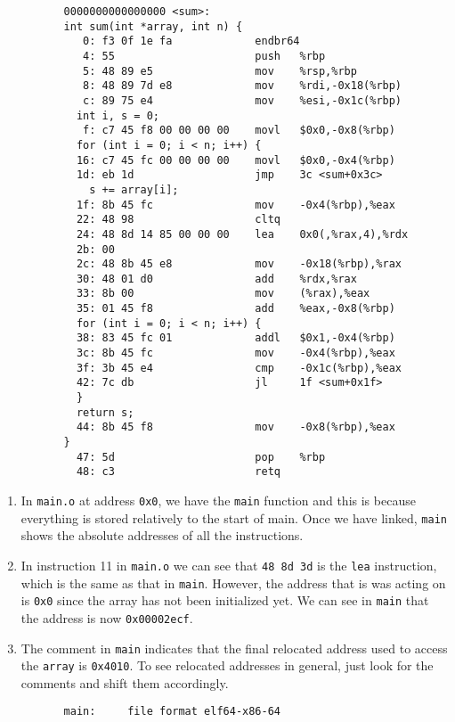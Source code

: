 \begin{example}
\begin{lstlisting}
          0000000000000000 <sum>:
          int sum(int *array, int n) {
             0:	f3 0f 1e fa          	endbr64 
             4:	55                   	push   %rbp
             5:	48 89 e5             	mov    %rsp,%rbp
             8:	48 89 7d e8          	mov    %rdi,-0x18(%rbp)
             c:	89 75 e4             	mov    %esi,-0x1c(%rbp)
            int i, s = 0; 
             f:	c7 45 f8 00 00 00 00 	movl   $0x0,-0x8(%rbp)
            for (int i = 0; i < n; i++) {
            16:	c7 45 fc 00 00 00 00 	movl   $0x0,-0x4(%rbp)
            1d:	eb 1d                	jmp    3c <sum+0x3c>
              s += array[i]; 
            1f:	8b 45 fc             	mov    -0x4(%rbp),%eax
            22:	48 98                	cltq   
            24:	48 8d 14 85 00 00 00 	lea    0x0(,%rax,4),%rdx
            2b:	00 
            2c:	48 8b 45 e8          	mov    -0x18(%rbp),%rax
            30:	48 01 d0             	add    %rdx,%rax
            33:	8b 00                	mov    (%rax),%eax
            35:	01 45 f8             	add    %eax,-0x8(%rbp)
            for (int i = 0; i < n; i++) {
            38:	83 45 fc 01          	addl   $0x1,-0x4(%rbp)
            3c:	8b 45 fc             	mov    -0x4(%rbp),%eax
            3f:	3b 45 e4             	cmp    -0x1c(%rbp),%eax
            42:	7c db                	jl     1f <sum+0x1f>
            }
            return s; 
            44:	8b 45 f8             	mov    -0x8(%rbp),%eax
          }
            47:	5d                   	pop    %rbp
            48:	c3                   	retq  
        \end{lstlisting}
        \begin{enumerate}
          \item In \texttt{main.o} at address \texttt{0x0}, we have the \texttt{main} function and this is because everything is stored relatively to the start of main. Once we have linked, \texttt{main} shows the absolute addresses of all the instructions. 
          \item In instruction 11 in \texttt{main.o} we can see that \texttt{48 8d 3d} is the \texttt{lea} instruction, which is the same as that in \texttt{main}. However, the address that is was acting on is \texttt{0x0} since the array has not been initialized yet. We can see in \texttt{main} that the address is now \texttt{0x00002ecf}. 
          \item The comment in \texttt{main} indicates that the final relocated address used to access the \texttt{array} is \texttt{0x4010}. To see relocated addresses in general, just look for the comments and shift them accordingly. 
        \end{enumerate}
        \begin{lstlisting}
          main:     file format elf64-x86-64


\end{lstlisting}
\end{example}
